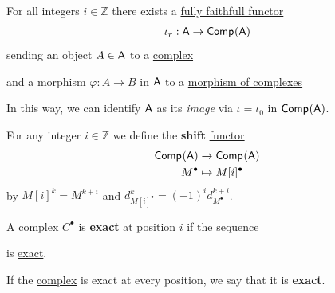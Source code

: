 \documentclass[../../../main]{subfiles}
\begin{document}
\begin{remark} \label{remark:inclussion-into-complex}
  For all integers \(i \in \mathbb{Z}\) there exists a \hyperref[def:functor-types]{fully faithfull functor}
  \begin{align*}
    \iota_{r}: \mathsf{A} \to \mathsf{Comp}^{}(\mathsf{A})
  \end{align*}
  sending an object \(A \in \mathsf{A}\) to a \hyperref[def:complex]{complex}
  \begin{center}
  \end{center}
  and a morphism \(\varphi: A \to B\) in \(\mathsf{A}\) to a \hyperref[def:complex-morphism]{morphism of complexes}
  \begin{center}
  \end{center}

  In this way, we can identify \(\mathsf{A}\) as its \textit{image} via \(\iota = \iota_{0}\) in \(\mathsf{Comp}^{}(\mathsf{A})\).
\end{remark}

\begin{definition} \label{def:shift-functor}
  For any integer \(i \in \mathbb{Z}\) we define the \textbf{shift} \hyperref[def:functor]{functor}
  \begin{align*}
    \mathsf{Comp}^{}(\mathsf{A}) &\to \mathsf{Comp}^{}(\mathsf{A}) \\
    M^{\bullet} &\mapsto M[i]^{\bullet}
  \end{align*}
  by \(M[i]^{k} = M^{k+i}\) and \(d_{M[i]^{\bullet}}^{k} = (-1)^{i}d_{M^{\bullet}}^{k + i}\).
\end{definition}

\begin{definition} \label{def:exact-complex}
  A \hyperref[def:complex]{complex} \(C^{\bullet}\) is \textbf{exact} at position \(i\) if the sequence
  \begin{center}
  \end{center}
  is \hyperref[def:exact-complex-sequence]{exact}.

  If the \hyperref[def:complex]{complex} is exact at every position, we say that it is \textbf{exact}.
\end{definition}
\end{document}
